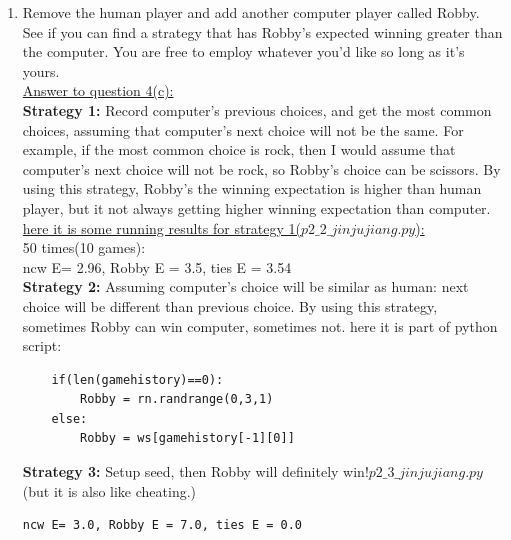 \documentclass{article}
\begin{document}
\begin{enumerate}
\begin{enumerate}
\item Remove the human player and add another computer player called Robby.  See if you can find a strategy that has Robby's expected winning greater than the computer.  You are free to employ whatever you'd like so long as it's yours.\\
\underline{Answer to question 4(c):}\\
\textbf{Strategy 1:} Record computer's previous choices, and get the most common choices, assuming that computer's next choice will not be the same. For example, if the most common choice is rock, then I would assume that computer's next choice will not be rock, so Robby's choice can be scissors.
By using this strategy, Robby's the winning expectation is higher than human player, but it not always getting higher winning expectation than computer.\\
\underline{here it is some running results for strategy 1($p2\_2\_jinjujiang.py$):}\\
50 times(10 games):\\
ncw E= 2.96, Robby E = 3.5, ties E = 3.54\\
\textbf{Strategy 2:} Assuming computer's choice will be similar as human: next choice will be different than previous choice. By using this strategy, sometimes Robby can win computer, sometimes not. here it is part of python script:
\begin{verbatim}
    if(len(gamehistory)==0):
        Robby = rn.randrange(0,3,1)
    else:
        Robby = ws[gamehistory[-1][0]]
\end{verbatim}
\textbf{Strategy 3:} Setup seed, then Robby will definitely win!$p2\_3\_jinjujiang.py$(but it is also like cheating.)
\begin{verbatim}
ncw E= 3.0, Robby E = 7.0, ties E = 0.0
\end{verbatim}
\end{enumerate}
\end{enumerate}
\end{document}

